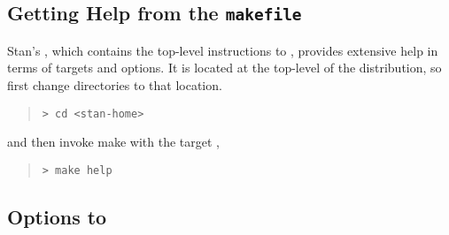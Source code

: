 %


\subsection{Getting Help from the {\tt makefile}}

Stan's , which contains the top-level instructions to
, provides extensive help in terms of targets and options.
It is located at the top-level of the distribution, so first change
directories to that location.
%
\begin{quote}
\begin{Verbatim}[fontshape=sl]
> cd <stan-home>
\end{Verbatim}
\end{quote} 
and then invoke make with the target ,

\begin{quote}
\begin{Verbatim}[fontshape=sl]
> make help
\end{Verbatim}
\end{quote}


\subsection{Options to }

